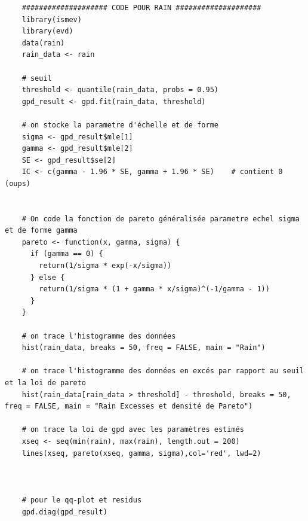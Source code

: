 \documentclass{article}
\theoremstyle{plain}
\theoremstyle{definition}
\theoremstyle{plain}
\begin{document}
\begin{lstlisting}
	#################### CODE POUR RAIN ####################
	library(ismev)
	library(evd)
	data(rain)
	rain_data <- rain

	# seuil	
	threshold <- quantile(rain_data, probs = 0.95)
	gpd_result <- gpd.fit(rain_data, threshold)

	# on stocke la parametre d'échelle et de forme
	sigma <- gpd_result$mle[1]
	gamma <- gpd_result$mle[2]
	SE <- gpd_result$se[2]
	IC <- c(gamma - 1.96 * SE, gamma + 1.96 * SE)    # contient 0 (oups)


	# On code la fonction de pareto généralisée parametre echel sigma et de forme gamma
	pareto <- function(x, gamma, sigma) {
	  if (gamma == 0) {
		return(1/sigma * exp(-x/sigma))
	  } else {
		return(1/sigma * (1 + gamma * x/sigma)^(-1/gamma - 1))
	  }
	}

	# on trace l'histogramme des données
	hist(rain_data, breaks = 50, freq = FALSE, main = "Rain")

	# on trace l'histogramme des données en excés par rapport au seuil et la loi de pareto
	hist(rain_data[rain_data > threshold] - threshold, breaks = 50, freq = FALSE, main = "Rain Excesses et densité de Pareto")

	# on trace la loi de gpd avec les paramètres estimés
	xseq <- seq(min(rain), max(rain), length.out = 200)
	lines(xseq, pareto(xseq, gamma, sigma),col='red', lwd=2)



	# pour le qq-plot et residus
	gpd.diag(gpd_result)

\end{lstlisting}
\end{document}
